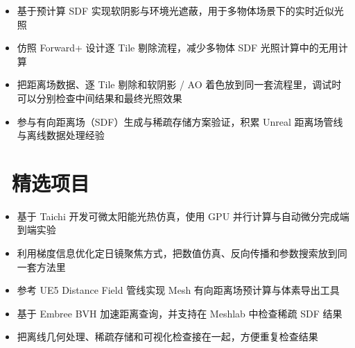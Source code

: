 \documentclass{resume}
\begin{document}
\begin{onehalfspacing}
\begin{itemize}
  \item 基于预计算 SDF 实现软阴影与环境光遮蔽，用于多物体场景下的实时近似光照
  \item 仿照 Forward+ 设计逐 Tile 剔除流程，减少多物体 SDF 光照计算中的无用计算
  \item 把距离场数据、逐 Tile 剔除和软阴影 / AO 着色放到同一套流程里，调试时可以分别检查中间结果和最终光照效果
\end{itemize}
\end{onehalfspacing}

\begin{onehalfspacing}
\begin{itemize}
  \item 参与有向距离场（SDF）生成与稀疏存储方案验证，积累 Unreal 距离场管线与离线数据处理经验
\end{itemize}
\end{onehalfspacing}

\section{\faCode\ 精选项目}

\begin{onehalfspacing}
\begin{itemize}
  \item 基于 Taichi 开发可微太阳能光热仿真，使用 GPU 并行计算与自动微分完成端到端实验
  \item 利用梯度信息优化定日镜聚焦方式，把数值仿真、反向传播和参数搜索放到同一套方法里
\end{itemize}
\end{onehalfspacing}

\begin{onehalfspacing}
\begin{itemize}
  \item 参考 UE5 Distance Field 管线实现 Mesh 有向距离场预计算与体素导出工具
  \item 基于 Embree BVH 加速距离查询，并支持在 Meshlab 中检查稀疏 SDF 结果
  \item 把离线几何处理、稀疏存储和可视化检查接在一起，方便重复检查结果
\end{itemize}
\end{onehalfspacing}
\end{document}
